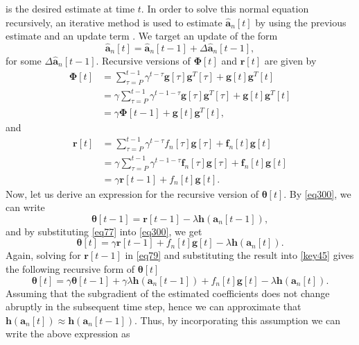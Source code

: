 \documentclass[11pt,final,onecolumn]{IEEEtran}
\begin{document}
\begin{itemize}
is the desired estimate at time $t$. In order to solve this normal equation recursively, an iterative method is used to estimate $\hat {\bm a}_n[t]$ by using the previous estimate and an update term . We target an update of the form
\begin{equation}\label{key}
\hat {\bm a}_n[t]=\hat {\bm a}_n[t-1]+ \Delta \hat {\bm a}_n[t-1],
\end{equation}
for some $\Delta \hat {\bm a}_n[t-1]$. Recursive versions of $\bm\Phi[t]$ and $\bm r[t] $ are given by 
\begin{align}\label{eq320}
\bm\Phi [t]&=\sum_{\tau=P}^{t-1} \gamma ^{t-\tau} \bm g[\tau]\bm g^T[\tau]+\bm g[t]\bm g^T[t]\\
&=\gamma \sum_{\tau=P}^{t-1} \gamma ^{t-1-\tau} \bm g[\tau]\bm g^T[\tau]+\bm g[t]\bm g^T[t]\\
&=\gamma \bm \Phi [t-1]+\bm g[t]\bm g^T[t], \label{eqpi}
\end{align}
and 
\begin{align}
\bm r [t]&=\sum_{\tau=P}^{t-1} \gamma ^{t-\tau} f_n[\tau]\bm g[\tau]+\bm f_n[t]\bm g[t]\\
&=\gamma \sum_{\tau=P}^{t-1} \gamma ^{t-1-\tau} \bm f_n[\tau]\bm g[\tau]+\bm f_n[t]\bm g[t]\\
&=\gamma \bm r [t-1]+ f_n[t] \bm g[t]. \label{eq77}
\end{align}
Now, let us derive an expression for the recursive version of $\bm \theta [t]$. By \eqref{eq300}, we can write
\begin{equation}\label{eq79}
\bm \theta [t-1]=\bm r[t-1]-\lambda  \bm h(\bm a_n[t-1]),
\end{equation} 
and by substituting \eqref{eq77} into \eqref{eq300}, we get
\begin{equation}\label{key45}
\bm \theta [t]=\gamma \bm r [t-1]+ f_n[t] \bm g[t]- \lambda \bm h(\bm a_n[t]).
\end{equation}
Again, solving for $\bm r[t-1]$ in \eqref{eq79} and substituting the result into \eqref{key45} gives the following recursive form of $\bm \theta [t]$ 
\begin{equation}\label{key}
\bm \theta [t]=\gamma \bm \theta [t-1] + \gamma \lambda \bm h(\bm a_n[t-1]) + f_n[t] \bm g[t]- \lambda \bm h(\bm a_n[t]).
\end{equation}
Assuming that the subgradient of the estimated coefficients does not change abruptly in the subsequent time step, hence we can approximate that $\bm h(\bm a_n[t])\approx \bm h(\bm a_n[t-1])$. Thus, by incorporating this assumption we can write the above expression as

\end{itemize}
\end{document}
